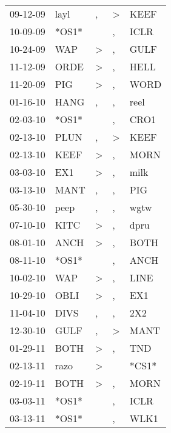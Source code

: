 \begin{supertabular}{lllll}
 09-12-09 &   layl &                , &     \textgreater &   KEEF \\
 10-09-09 &  *OS1* &                  &                , &   ICLR \\
 10-24-09 &    WAP &     \textgreater &                , &   GULF \\
 11-12-09 &   ORDE &     \textgreater &                , &   HELL \\
 11-20-09 &    PIG &     \textgreater &                , &   WORD \\
 01-16-10 &   HANG &                , &                , &   reel \\
 02-03-10 &  *OS1* &                  &                , &   CRO1 \\
 02-13-10 &   PLUN &                , &     \textgreater &   KEEF \\
 02-13-10 &   KEEF &     \textgreater &                , &   MORN \\
 03-03-10 &    EX1 &     \textgreater &                , &   milk \\
 03-13-10 &   MANT &                , &                , &    PIG \\
 05-30-10 &   peep &                , &                , &   wgtw \\
 07-10-10 &   KITC &     \textgreater &                , &   dpru \\
 08-01-10 &   ANCH &     \textgreater &                , &   BOTH \\
 08-11-10 &  *OS1* &                  &                , &   ANCH \\
 10-02-10 &    WAP &     \textgreater &                , &   LINE \\
 10-29-10 &   OBLI &     \textgreater &                , &    EX1 \\
 11-04-10 &   DIVS &                , &                , &    2X2 \\
 12-30-10 &   GULF &                , &     \textgreater &   MANT \\
 01-29-11 &   BOTH &     \textgreater &                , &    TND \\
 02-13-11 &   razo &     \textgreater &                  &  *CS1* \\
 02-19-11 &   BOTH &     \textgreater &                , &   MORN \\
 03-03-11 &  *OS1* &                  &                , &   ICLR \\
 03-13-11 &  *OS1* &                  &                , &   WLK1 \\

\end{supertabular}
